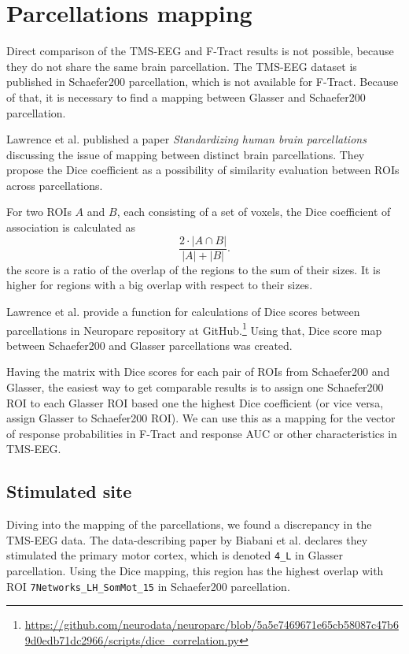 \section{Parcellations mapping}\label{sec:dice}

Direct comparison of the TMS-EEG and F-Tract results is not possible, because they do not share the same brain parcellation. The TMS-EEG dataset is published in Schaefer200 parcellation, which is not available for F-Tract. Because of that, it is necessary to find a mapping between Glasser and Schaefer200 parcellation.

Lawrence et al. published a paper \textit{Standardizing human brain parcellations} \cite{lawrence_standardizing_2021} discussing the issue of mapping between distinct brain parcellations. They propose the Dice coefficient \cite{dice_measures_1945} as a possibility of similarity evaluation between ROIs across parcellations. 

For two ROIs $A$ and $B$, each consisting of a set of voxels, the Dice coefficient of association is calculated as  
$$
\frac{2 \cdot |A\cap B|}{|A|+|B|}.
$$
the score is a ratio of the overlap of the regions to the sum of their sizes. It is higher for regions with a big overlap with respect to their sizes.

Lawrence et al. provide a function for calculations of Dice scores between parcellations in Neuroparc repository at GitHub.\footnote{\url{https://github.com/neurodata/neuroparc/blob/5a5e7469671e65cb58087c47b69d0edb71dc2966/scripts/dice_correlation.py}} Using that, Dice score map between Schaefer200 and Glasser parcellations was created.

Having the matrix with Dice scores for each pair of ROIs from Schaefer200 and Glasser, the easiest way to get comparable results is to assign one Schaefer200 ROI to each Glasser ROI based one the highest Dice coefficient (or vice versa, assign Glasser to Schaefer200 ROI). We can use this as a mapping for the vector of response probabilities in F-Tract and response AUC or other characteristics in TMS-EEG. 

\subsection{Stimulated site}\label{sec:parcellations-mapping-stimulated_roi}

Diving into the mapping of the parcellations, we found a discrepancy in the TMS-EEG data. The data-describing paper by Biabani et al. \cite{biabani_characterizing_2019} declares they stimulated the primary motor cortex, which is denoted \texttt{4\_L} in Glasser parcellation. Using the Dice mapping, this region has the highest overlap with ROI \texttt{7Networks\_LH\_SomMot\_15} in Schaefer200 parcellation. 

